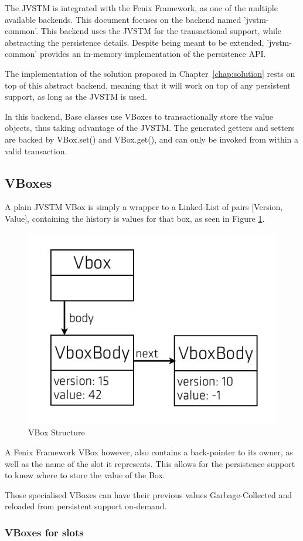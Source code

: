 The JVSTM is integrated with the Fenix Framework, as one of the
multiple available backends. This document focuses on the backend
named 'jvstm-common'. This backend uses the JVSTM for the
transactional support, while abstracting the persistence
details. Despite being meant to be extended, 'jvstm-common' provides
an in-memory implementation of the persistence API.

The implementation of the solution proposed in
Chapter~\ref{chap:solution} rests on top of this abstract backend,
meaning that it will work on top of any persistent support, as long as
the JVSTM is used.

In this backend, Base classes use VBoxes to transactionally store the
value objects, thus taking advantage of the JVSTM. The generated
getters and setters are backed by VBox.set() and VBox.get(), and can
only be invoked from within a valid transaction.

\subsection{VBoxes}

A plain JVSTM VBox is simply a wrapper to a Linked-List of pairs
[Version, Value], containing the history is values for that
box, as seen in Figure \ref{fig:vbox}.

\begin{figure}
\centering
\includegraphics[width=0.5\linewidth]{vbox-list}
\caption{VBox Structure}
\label{fig:vbox}
\end{figure}

A Fenix Framework VBox however, also contains a back-pointer to its
owner, as well as the name of the slot it represents. This allows for
the persistence support to know where to store the value of the Box.

Those specialised VBoxes can have their previous values
Garbage-Collected and reloaded from persistent support on-demand.

\subsubsection{VBoxes for slots}

